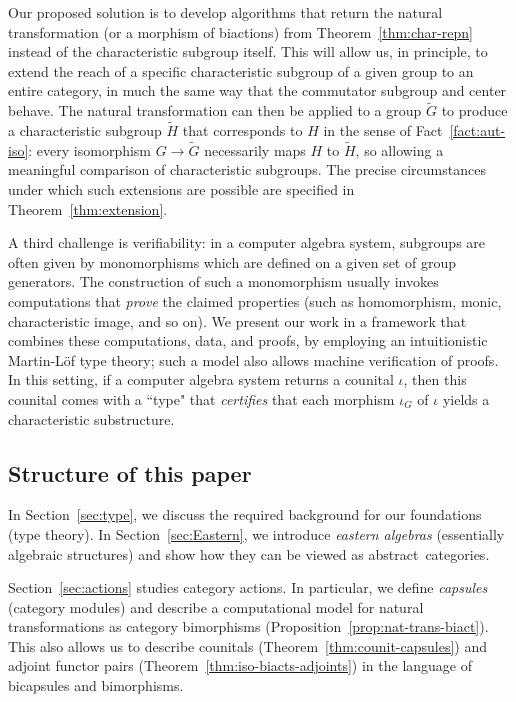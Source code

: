 \documentclass{amsart}
\numberwithin{lstfloat}{section}
\theoremstyle{definition}
\theoremstyle{remark}
\numberwithin{equation}{section}
\begin{document}
Our proposed solution is to develop algorithms that return the natural
transformation (or a morphism of biactions) from Theorem~\ref{thm:char-repn} 
instead of the characteristic subgroup
itself. This will allow us, in principle, to extend the reach of a specific
characteristic subgroup of a given group to an entire category, in much the same
way that the commutator subgroup and center behave. 
The natural transformation can then be applied to a group $\tilde{G}$ to
produce a characteristic subgroup $\tilde{H}$ that corresponds to $H$ in the
sense of Fact~\ref{fact:aut-iso}: every isomorphism $G\to\tilde{G}$ necessarily maps
$H$ to $\tilde{H}$, so allowing a meaningful comparison of characteristic
subgroups. The precise circumstances
under which such extensions are possible are specified in Theorem~\ref{thm:extension}. 

A third challenge is verifiability: in a computer algebra system, subgroups are often given by monomorphisms which are defined on a given set of group generators. The construction of such a monomorphism usually invokes computations that \emph{prove} the claimed properties (such as homomorphism, monic, characteristic image, and so on). We present our work in a framework that combines these computations, data, and proofs, by employing an intuitionistic Martin-L\"of type theory; such a model also allows machine verification of proofs.  In this setting, if a computer algebra system returns a counital $\iota$, then this counital comes with a ``type" that \emph{certifies} that each morphism $\iota_G$ of $\iota$ yields a characteristic substructure. 


\subsection{Structure of this paper}
In Section~\ref{sec:type}, we discuss the required background for our
foundations (type theory). In Section~\ref{sec:Eastern}, we introduce
\emph{eastern algebras} (essentially algebraic structures) and show
how they can be
viewed as abstract~categories.

Section~\ref{sec:actions} studies category actions. In particular, we define
\emph{capsules} (category modules) and describe a computational model for
natural transformations  as category bimorphisms
(Proposition~\ref{prop:nat-trans-biact}). This also allows us to describe  
counitals (Theorem~\ref{thm:counit-capsules}) and adjoint functor pairs
(Theorem~\ref{thm:iso-biacts-adjoints}) in the language of bicapsules and bimorphisms.
\end{document}
